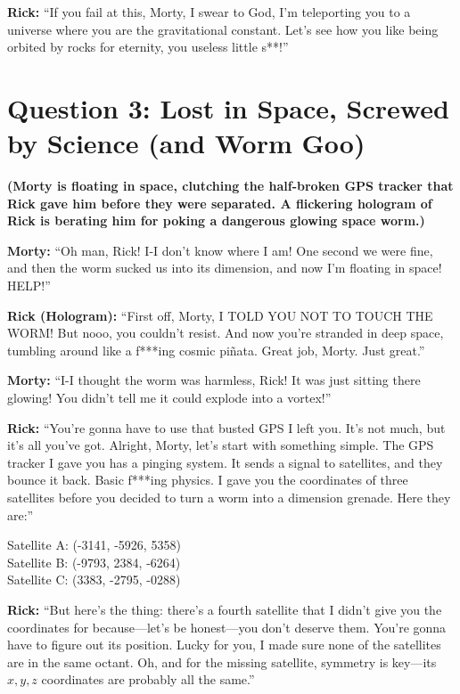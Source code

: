 \documentclass[a4paper, 12pt]{exam}
\begin{document}
\noindent \textbf{Rick:} “If you fail at this, Morty, I swear to God, I’m teleporting you to a universe where you are the gravitational constant. Let’s see how you like being orbited by rocks for eternity, you useless little s**!”

		

	
	\pagebreak
	

\section*{Question 3: Lost in Space, Screwed by Science (and Worm Goo)}

\noindent \textbf{(Morty is floating in space, clutching the half-broken GPS tracker that Rick gave him before they were separated. A flickering hologram of Rick is berating him for poking a dangerous glowing space worm.)} 

\bigskip
\noindent \textbf{Morty:} “Oh man, Rick! I-I don’t know where I am! One second we were fine, and then the worm sucked us into its dimension, and now I’m floating in space! HELP!” \bigskip

\noindent \textbf{Rick (Hologram):} “First off, Morty, I TOLD YOU NOT TO TOUCH THE WORM! But nooo, you couldn’t resist. And now you’re stranded in deep space, tumbling around like a f***ing cosmic piñata. Great job, Morty. Just great.” \bigskip

\noindent \textbf{Morty:} “I-I thought the worm was harmless, Rick! It was just sitting there glowing! You didn’t tell me it could explode into a vortex!” 

\bigskip

\noindent \textbf{Rick:} “You’re gonna have to use that busted GPS I left you. It’s not much, but it’s all you’ve got. Alright, Morty, let’s start with something simple. The GPS tracker I gave you has a pinging system. It sends a signal to satellites, and they bounce it back. Basic f***ing physics. I gave you the coordinates of three satellites before you decided to turn a worm into a dimension grenade. Here they are:”

\begin{center}
Satellite A: (-3141, -5926, 5358) \\
Satellite B: (-9793, 2384, -6264) \\
Satellite C: (3383, -2795, -0288)
\end{center}


\noindent \textbf{Rick:} “But here’s the thing: there’s a fourth satellite that I didn’t give you the coordinates for because—let’s be honest—you don’t deserve them. You’re gonna have to figure out its position. Lucky for you, I made sure none of the satellites are in the same octant. Oh, and for the missing satellite, symmetry is key—its \(x, y, z\) coordinates are probably all the same.” \bigskip
\end{document}
